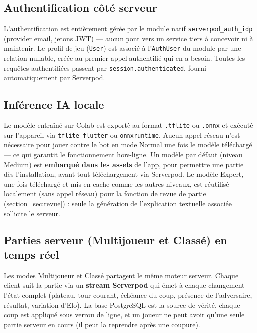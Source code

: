 \documentclass[a4paper,11pt]{article}
\begin{document}
\subsection{Authentification côté serveur}
L'authentification est entièrement gérée par le module natif
\texttt{serverpod\_auth\_idp} (provider email, jetons JWT) --- aucun pont vers un
service tiers à concevoir ni à maintenir. Le profil de jeu (\texttt{User}) est
associé à l'\texttt{AuthUser} du module par une relation nullable, créée au premier
appel authentifié qui en a besoin. Toutes les requêtes authentifiées passent par
\texttt{session.authenticated}, fourni automatiquement par Serverpod.

\subsection{Inférence IA locale}
Le modèle entraîné sur Colab est exporté au format \texttt{.tflite} ou \texttt{.onnx}
et exécuté sur l'appareil via \texttt{tflite\_flutter} ou \texttt{onnxruntime}. Aucun
appel réseau n'est nécessaire pour jouer contre le bot en mode Normal une fois le modèle
téléchargé --- ce qui garantit le fonctionnement hors-ligne. Un modèle par défaut
(niveau Medium) est \textbf{embarqué dans les assets} de l'app, pour permettre une
partie dès l'installation, avant tout téléchargement via Serverpod. Le modèle
Expert, une fois téléchargé et mis en cache comme les autres niveaux, est réutilisé
localement (sans appel réseau) pour la fonction de revue de partie
(section~\ref{sec:revue}) : seule la génération de l'explication textuelle associée
sollicite le serveur.

\subsection{Parties serveur (Multijoueur et Classé) en temps réel}
Les modes Multijoueur et Classé partagent le même moteur serveur. Chaque client suit
la partie via un \textbf{stream Serverpod} qui émet à chaque changement l'état
complet (plateau, tour courant, échéance du coup, présence de l'adversaire,
résultat, variation d'Elo). La base PostgreSQL est la source de vérité, chaque coup
est appliqué sous verrou de ligne, et un joueur ne peut avoir qu'une seule partie
serveur en cours (il peut la reprendre après une coupure).
\end{document}
